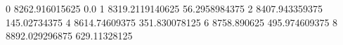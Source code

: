 0 8262.916015625 0.0
1 8319.2119140625 56.2958984375
2 8407.943359375 145.02734375
4 8614.74609375 351.830078125
6 8758.890625 495.974609375
8 8892.029296875 629.11328125
